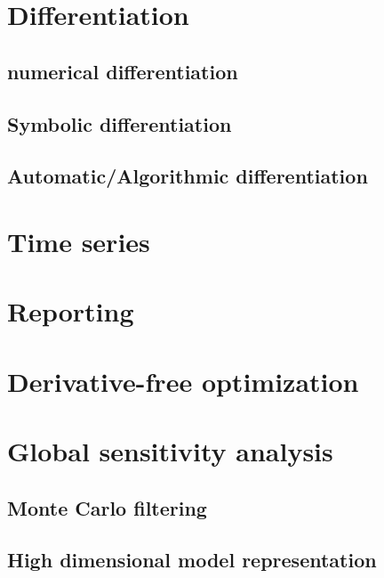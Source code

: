 \documentclass[letterpaper,10pt,english]{sphinxmanual}
\begin{document}
\section{Differentiation}
\label{capabilities:differentiation}

\subsection{numerical differentiation}
\label{capabilities:numerical-differentiation}

\subsection{Symbolic differentiation}
\label{capabilities:symbolic-differentiation}

\subsection{Automatic/Algorithmic differentiation}
\label{capabilities:automatic-algorithmic-differentiation}

\section{Time series}
\label{capabilities:time-series}

\section{Reporting}
\label{capabilities:reporting}

\section{Derivative-free optimization}
\label{capabilities:derivative-free-optimization}

\section{Global sensitivity analysis}
\label{capabilities:global-sensitivity-analysis}

\subsection{Monte Carlo filtering}
\label{capabilities:monte-carlo-filtering}

\subsection{High dimensional model representation}
\label{capabilities:high-dimensional-model-representation}
\end{document}
